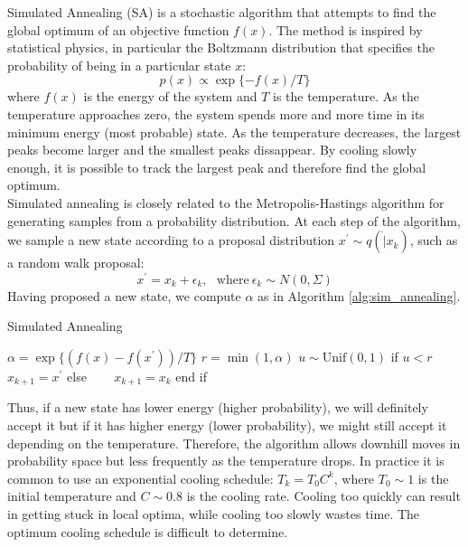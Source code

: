 Simulated Annealing (SA) is a stochastic algorithm that attempts to find the global optimum of an objective function $f(x)$. The method is inspired by statistical physics, in particular the Boltzmann distribution that specifies the probability of being in a particular state $x$:
\begin{equation}
    p(x) \propto \exp\{-f(x)/T\}
\end{equation}
where $f(x)$ is the energy of the system and $T$ is the temperature. As the temperature approaches zero, the system spends more and more time in its minimum energy (most probable) state. As the temperature decreases, the largest peaks become larger and the smallest peaks dissappear. By cooling slowly enough, it is possible to track the largest peak and therefore find the global optimum.\\

Simulated annealing is closely related to the Metropolis-Hastings algorithm for generating samples from a probability distribution. At each step of the algorithm, we sample a new state according to a proposal distribution $x^{\prime} \sim q(\dot|x_k)$, such as a random walk proposal:
\begin{equation}
    x^{\prime} = x_k + \epsilon_k, ~~~ \mathrm{where}~ \epsilon_k \sim N(0,\Sigma)
\end{equation}
Having proposed a new state, we compute $\alpha$ as in Algorithm \ref{alg:sim_annealing}.
\begin{algorithm}
\caption{Simulated Annealing}
\label{alg:sim_annealing}
\begin{algorithmic}[1]
\STATE $\alpha = \exp\{(f(x)-f(x^{\prime}))/T\}$
\STATE $r = \min(1,\alpha)$
\STATE $u \sim \mathrm{Unif}(0,1)$
\STATE if $u < r$ 
\STATE ~~~ $x_{k+1} = x^{\prime}$
\STATE else
\STATE ~~~ $x_{k+1} = x_k$
\STATE end if  
\end{algorithmic}
\end{algorithm}
Thus, if a new state has lower energy (higher probability), we will definitely accept it but if it has higher energy (lower probability), we might still accept it depending on the temperature. Therefore, the algorithm allows downhill moves in probability space but less frequently as the temperature drops. In practice it is common to use an exponential cooling schedule: $T_k = T_0 C^{k}$, where $T_0 \sim 1$ is the initial temperature and $C \sim 0.8$ is the cooling rate. Cooling too quickly can result in getting stuck in local optima, while cooling too slowly wastes time. The optimum cooling schedule is difficult to determine.    

